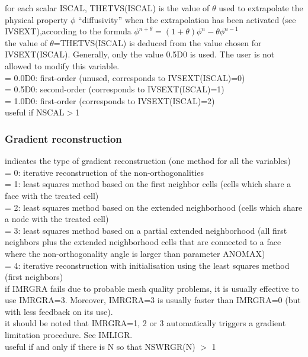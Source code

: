 {for each scalar ISCAL, THETVS(ISCAL) is the value of $\theta$ used to
extrapolate the physical property $\phi$ ``diffusivity'' when the extrapolation has
been activated (see IVSEXT),according to the
formula $\phi^{n+\theta}=(1+\theta)\phi^n-\theta \phi^{n-1}$\\
the value of $\theta$=THETVS(ISCAL) is deduced from the value chosen for
IVSEXT(ISCAL). Generally, only the value 0.5D0 is used. The user is not
allowed to modify this variable.\\
\hspace*{1.3cm}= 0.0D0: first-order (unused, corresponds to
IVSEXT(ISCAL)=0)\\ 
\hspace*{1.3cm}= 0.5D0: second-order (corresponds to IVSEXT(ISCAL)=1) \\
\hspace*{1.3cm}= 1.0D0: first-order (corresponds to IVSEXT(ISCAL)=2) \\
useful if NSCAL$>$1}


\subsubsection{Gradient reconstruction}

{indicates the type of gradient reconstruction (one method for all the
variables)\\ 
\hspace*{1.3cm}= 0: iterative reconstruction of the non-orthogonalities\\
\hspace*{1.3cm}= 1: least squares method based on the first neighbor cells
(cells which share a face with the treated cell)\\
\hspace*{1.3cm}= 2: least squares method based on the extended neighborhood
(cells which share a node with the treated cell)\\ 
\hspace*{1.3cm}= 3: least squares method based on a partial extended
neighborhood (all first neighbors plus the extended neighborhood cells that
are connected to a face where the non-orthogonality angle is larger than
parameter ANOMAX)\\
\hspace*{1.3cm}= 4: iterative reconstruction with initialisation using the least
squares method (first neighbors)\\
if IMRGRA fails due to probable mesh quality problems, it is usually effective
to use IMRGRA=3. Moreover, IMRGRA=3 is usually faster than IMRGRA=0 (but with
less feedback on its use).\\
it should be noted that IMRGRA=1, 2 or 3 automatically triggers a gradient
limitation procedure. See IMLIGR.\\
useful if and only if there is N so that NSWRGR(N) $>$ 1}

